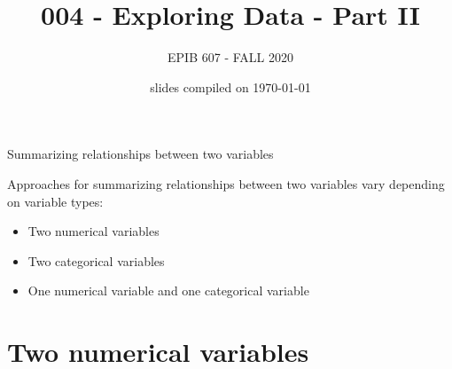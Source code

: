 \documentclass[10pt]{beamer}\usepackage[]{graphicx}\usepackage[]{color}
\begin{document}
	
	
	
	
	\title{004 - Exploring Data - Part II}
	\author{EPIB 607 - FALL 2020}
	
	\date{slides compiled on \today}
	
	\maketitle

	
	

						
\begin{frame}{Summarizing relationships between two variables}
							\protect\hypertarget{summarizing-relationships-between-two-variables}{}
							
							Approaches for summarizing relationships between two variables vary
							depending on variable types:
							
							\begin{itemize}
								\item
								Two numerical variables
								\item
								Two categorical variables
								\item
								One numerical variable and one categorical variable
							\end{itemize}
							
\end{frame}


\section{Two numerical variables}
\end{document}
